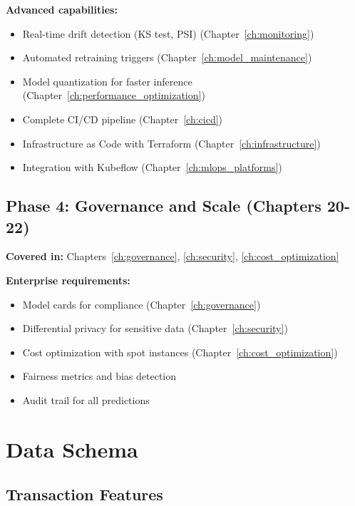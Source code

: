 \textbf{Advanced capabilities:}
\begin{itemize}
    \item Real-time drift detection (KS test, PSI) (Chapter~\ref{ch:monitoring})
    \item Automated retraining triggers (Chapter~\ref{ch:model_maintenance})
    \item Model quantization for faster inference (Chapter~\ref{ch:performance_optimization})
    \item Complete CI/CD pipeline (Chapter~\ref{ch:cicd})
    \item Infrastructure as Code with Terraform (Chapter~\ref{ch:infrastructure})
    \item Integration with Kubeflow (Chapter~\ref{ch:mlops_platforms})
\end{itemize}

\subsection{Phase 4: Governance and Scale (Chapters 20-22)}

\textbf{Covered in:} Chapters~\ref{ch:governance}, \ref{ch:security}, \ref{ch:cost_optimization}

\textbf{Enterprise requirements:}
\begin{itemize}
    \item Model cards for compliance (Chapter~\ref{ch:governance})
    \item Differential privacy for sensitive data (Chapter~\ref{ch:security})
    \item Cost optimization with spot instances (Chapter~\ref{ch:cost_optimization})
    \item Fairness metrics and bias detection
    \item Audit trail for all predictions
\end{itemize}

\section{Data Schema}

\subsection{Transaction Features}

